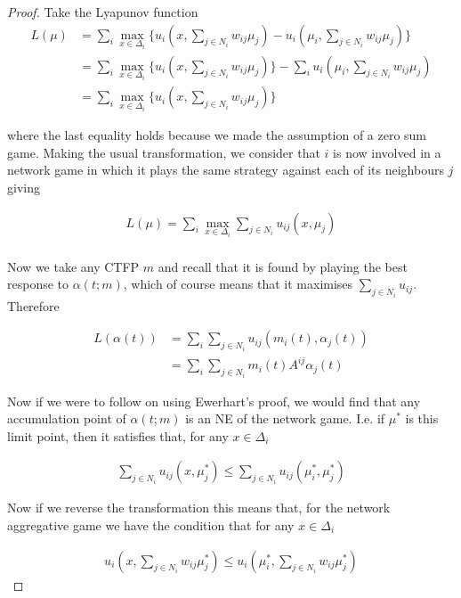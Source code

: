 \documentclass{article}
\theoremstyle{definition}
\begin{document}
	\begin{proof}
		Take the Lyapunov function
		\begin{align}
			L(\mu) & = \sum_i \max_{x \in \Delta_i} \{u_i(x, \sum_{j \in N_i} w_{ij} \mu_j) - u_i(\mu_i, \sum_{j \in N_i} w_{ij} \mu_j) \} \nonumber \\
			& = \sum_i \max_{x \in \Delta_i} \{u_i(x, \sum_{j \in N_i} w_{ij} \mu_j)\} - \sum_i u_i(\mu_i, \sum_{j \in N_i} w_{ij} \mu_j) \nonumber \\
			& = \sum_i \max_{x \in \Delta_i} \{u_i(x, \sum_{j \in N_i} w_{ij} \mu_j)\} \nonumber
		\end{align}
		
		where the last equality holds because we made the assumption of a zero sum game. Making the usual transformation, we consider that $i$ is now involved in a network game in which it plays the same strategy against each of its neighbours $j$ giving
		
		\begin{align}
			L(\mu) = \sum_i \max_{x \in \Delta_i} \sum_{j \in N_i}  u_{ij}(x, \mu_j) \nonumber \\
		\end{align}
		
		Now we take any CTFP $m$ and recall that it is found by playing the best response to $\alpha(t; m)$, which of course means that it maximises $\sum_{j \in N_i} u_{ij}$. Therefore
		
		\begin{align}
			L(\alpha(t)) & = \sum_i \sum_{j \in N_i} u_{ij}(m_i(t), \alpha_j(t)) \nonumber \\
			& = \sum_i \sum_{j \in N_i} m_i(t) A^{ij} \alpha_j(t)
		\end{align}
		 
		 Now if we were to follow on using Ewerhart's proof, we would find that any accumulation point of $\alpha(t; m)$ is an NE of the network game. I.e. if $\mu^*$ is this limit point, then it satisfies that, for any $x \in \Delta_i$
		 
		 \begin{align}
		 	\sum_{j \in N_i} u_{ij}(x, \mu_j^*) \leq 	\sum_{j \in N_i} u_{ij}(\mu_i^*, \mu_j^*) \nonumber
		 \end{align}
		 
		 Now if we reverse the transformation this means that, for the network aggregative game we have the condition that for any $x \in \Delta_i$
		 
		 \begin{align}
		 	u_{i}(x, \sum_{j \in N_i} w_{ij} \mu_j^*) \leq u_{i}(\mu_i^*, \sum_{j \in N_i} w_{ij} \mu_j^*)
		 \end{align}
		 
	\end{proof}
	\newpage
	
\end{document}
